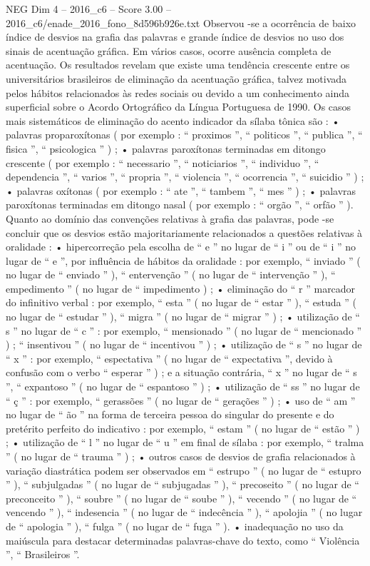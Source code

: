 \begin{textsample}{NEG Dim 4 – 2016\_c6 – Score 3.00 – 2016\_c6/enade\_2016\_fono\_8d596b926e.txt}
Observou -se a ocorrência de baixo índice de desvios na grafia das palavras e grande índice de desvios no uso dos sinais de acentuação gráfica.
Em vários casos, ocorre ausência completa de acentuação.
Os resultados revelam que existe uma tendência crescente entre os universitários brasileiros de eliminação da acentuação gráfica, talvez motivada pelos hábitos relacionados às redes sociais ou devido a um conhecimento ainda superficial sobre o Acordo Ortográfico da Língua Portuguesa de 1990.
Os casos mais sistemáticos de eliminação do acento indicador da sílaba tônica são : • palavras proparoxítonas ( por exemplo : “ proximos ”, “ politicos ”, “ publica ”, “ fisica ”, “ psicologica ” ) ; • palavras paroxítonas terminadas em ditongo crescente ( por exemplo : “ necessario ”, “ noticiarios ”, “ individuo ”, “ dependencia ”, “ varios ”, “ propria ”, “ violencia ”, “ ocorrencia ”, “ suicidio ” ) ; • palavras oxítonas ( por exemplo : “ ate ”, “ tambem ”, “ mes ” ) ; • palavras paroxítonas terminadas em ditongo nasal ( por exemplo : “ orgão ”, “ orfão ” ).
Quanto ao domínio das convenções relativas à grafia das palavras, pode -se concluir que os desvios estão majoritariamente relacionados a questões relativas à oralidade : • hipercorreção pela escolha de “ e ” no lugar de “ i ” ou de “ i ” no lugar de “ e ”, por influência de hábitos da oralidade : por exemplo, “ inviado ” ( no lugar de “ enviado ” ), “ entervenção ” ( no lugar de “ intervenção ” ), “ empedimento ” ( no lugar de “ impedimento ) ; • eliminação do “ r ” marcador do infinitivo verbal : por exemplo, “ esta ” ( no lugar de “ estar ” ), “ estuda ” ( no lugar de “ estudar ” ), “ migra ” ( no lugar de “ migrar ” ) ; • utilização de “ s ” no lugar de “ c ” : por exemplo, “ mensionado ” ( no lugar de “ mencionado ” ) ; “ insentivou ” ( no lugar de “ incentivou ” ) ; • utilização de “ s ” no lugar de “ x ” : por exemplo, “ espectativa ” ( no lugar de “ expectativa ”, devido à confusão com o verbo “ esperar ” ) ; e a situação contrária, “ x ” no lugar de “ s ”, “ expantoso ” ( no lugar de “ espantoso ” ) ; • utilização de “ ss ” no lugar de “ ç ” : por exemplo, “ gerassões ” ( no lugar de “ gerações ” ) ; • uso de “ am ” no lugar de “ ão ” na forma de terceira pessoa do singular do presente e do pretérito perfeito do indicativo : por exemplo, “ estam ” ( no lugar de “ estão ” ) ; • utilização de “ l ” no lugar de “ u ” em final de sílaba : por exemplo, “ tralma ” ( no lugar de “ trauma ” ) ; • outros casos de desvios de grafia relacionados à variação diastrática podem ser observados em “ estrupo ” ( no lugar de “ estupro ” ), “ subjulgadas ” ( no lugar de “ subjugadas ” ), “ precoseito ” ( no lugar de “ preconceito ” ), “ soubre ” ( no lugar de “ soube ” ), “ vecendo ” ( no lugar de “ vencendo ” ), “ indesencia ” ( no lugar de “ indecência ” ), “ apolojia ” ( no lugar de “ apologia ” ), “ fulga ” ( no lugar de “ fuga ” ). • inadequação no uso da maiúscula para destacar determinadas palavras-chave do texto, como “ Violência ”, “ Brasileiros ”.

\end{textsample}
